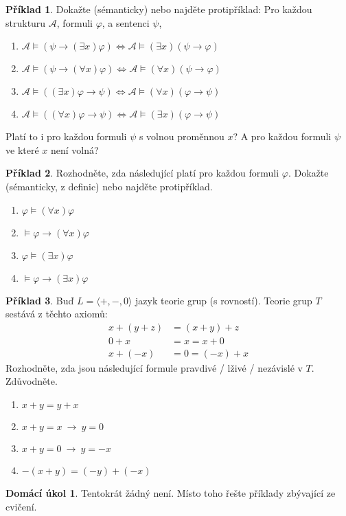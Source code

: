 \documentclass[a4paper]{article}
\theoremstyle{definition}
\newtheorem{problem}{Příklad}
\newtheorem*{ukol}{Domácí úkol}
\begin{document}
    
\medskip\begin{problem}
    Dokažte (sémanticky) nebo najděte protipříklad: Pro každou strukturu $\mathcal{A}$, formuli $\varphi$, a sentenci $\psi$,
    \begin{enumerate}
    \item $\mathcal{A}\models (\psi \to (\exists x)\varphi) \Leftrightarrow \mathcal{A}\models (\exists x)(\psi \to \varphi)$
    \item $\mathcal{A}\models (\psi \to (\forall x)\varphi) \Leftrightarrow \mathcal{A}\models (\forall x)(\psi \to \varphi)$
    \item $\mathcal{A}\models ((\exists x)\varphi \to \psi) \Leftrightarrow \mathcal{A}\models (\forall x)(\varphi \to \psi)$
    \item $\mathcal{A}\models ((\forall x)\varphi \to \psi ) \Leftrightarrow \mathcal{A}\models (\exists x)(\varphi \to \psi)$
    \end{enumerate}
    Platí to i pro každou formuli $\psi$ s volnou proměnnou $x$? A pro každou formuli $\psi$ ve které $x$ není volná?
\end{problem}
    

\medskip\begin{problem}
    Rozhodněte, zda následující platí pro každou formuli $\varphi$. Dokažte (sémanticky, z definic) nebo najděte protipříklad.
    \begin{enumerate}
       \item $\varphi \models (\forall x)\varphi$
       \item $\models \varphi \to (\forall x)\varphi$
       \item $\varphi \models (\exists x)\varphi$
       \item $\models \varphi \to (\exists x)\varphi$
    \end{enumerate}
\end{problem}
    
    
\medskip\begin{problem}
    Buď $L=\langle +, -, 0\rangle$ jazyk teorie grup (s rovností). Teorie grup $T$ sestává z těchto axiomů:
    \begin{align*}
    x+(y+z)&=(x+y)+z\\
    0+x&=x=x+0\\
    x+(-x)&=0=(-x)+x
    \end{align*}
    Rozhodněte, zda jsou následující formule pravdivé / lživé / nezávislé v $T$. Zdůvodněte.
    \begin{enumerate}
        \item $x+y=y+x$
        \item $x+y=x\ \rightarrow\ y=0$
        \item $x+y=0\ \rightarrow\ y=-x$
        \item $-(x+y)=(-y)+(-x)$
    \end{enumerate}
\end{problem}


\medskip\begin{ukol}
Tentokrát žádný není. Místo toho řešte příklady zbývající ze cvičení.
\end{ukol}
\end{document}
